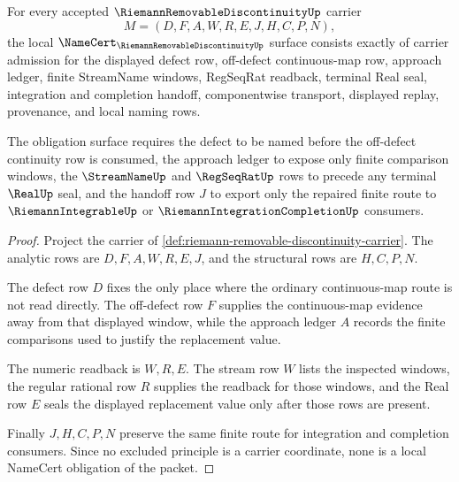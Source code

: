 \begin{theorem}
\label{thm:riemann-removable-discontinuity-namecert-obligations}
For every accepted $\RiemannRemovableDiscontinuityUp$ carrier
$$
M=(D,F,A,W,R,E,J,H,C,P,N),
$$
the local $\NameCert_{\RiemannRemovableDiscontinuityUp}$ surface consists exactly of carrier admission for the displayed defect row, off-defect continuous-map row, approach ledger, finite StreamName windows, RegSeqRat readback, terminal Real seal, integration and completion handoff, componentwise transport, displayed replay, provenance, and local naming rows.

The obligation surface requires the defect to be named before the off-defect continuity row is consumed, the approach ledger to expose only finite comparison windows, the $\StreamNameUp$ and $\RegSeqRatUp$ rows to precede any terminal $\RealUp$ seal, and the handoff row $J$ to export only the repaired finite route to $\RiemannIntegrableUp$ or $\RiemannIntegrationCompletionUp$ consumers.
\end{theorem}
\begin{proof}
Project the carrier of \autoref{def:riemann-removable-discontinuity-carrier}. The analytic rows are $D,F,A,W,R,E,J$, and the structural rows are $H,C,P,N$.

The defect row $D$ fixes the only place where the ordinary continuous-map route is not read directly. The off-defect row $F$ supplies the continuous-map evidence away from that displayed window, while the approach ledger $A$ records the finite comparisons used to justify the replacement value.

The numeric readback is $W,R,E$. The stream row $W$ lists the inspected windows, the regular rational row $R$ supplies the readback for those windows, and the Real row $E$ seals the displayed replacement value only after those rows are present.

Finally $J,H,C,P,N$ preserve the same finite route for integration and completion consumers. Since no excluded principle is a carrier coordinate, none is a local NameCert obligation of the packet.
\end{proof}

